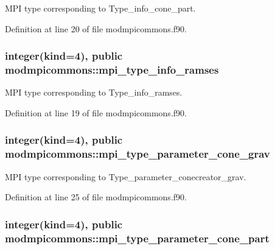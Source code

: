 M\-P\-I type corresponding to Type\-\_\-info\-\_\-cone\-\_\-part. 



Definition at line 20 of file modmpicommons.\-f90.

\hypertarget{classmodmpicommons_ad9669ed4065b2389ec88512a5fa63c3c}{
\subsubsection[{mpi\-\_\-type\-\_\-info\-\_\-ramses}]{\setlength{\rightskip}{0pt plus 5cm}integer(kind=4), public modmpicommons\-::mpi\-\_\-type\-\_\-info\-\_\-ramses}}\label{classmodmpicommons_ad9669ed4065b2389ec88512a5fa63c3c}


M\-P\-I type corresponding to Type\-\_\-info\-\_\-ramses. 



Definition at line 19 of file modmpicommons.\-f90.

\hypertarget{classmodmpicommons_a9f948ab13dbfdd8f08dede33bd3deed1}{
\subsubsection[{mpi\-\_\-type\-\_\-parameter\-\_\-cone\-\_\-grav}]{\setlength{\rightskip}{0pt plus 5cm}integer(kind=4), public modmpicommons\-::mpi\-\_\-type\-\_\-parameter\-\_\-cone\-\_\-grav}}\label{classmodmpicommons_a9f948ab13dbfdd8f08dede33bd3deed1}


M\-P\-I type corresponding to Type\-\_\-parameter\-\_\-conecreator\-\_\-grav. 



Definition at line 25 of file modmpicommons.\-f90.

\hypertarget{classmodmpicommons_a5ea3acdd1a05643c2a359ed42abd3264}{
\subsubsection[{mpi\-\_\-type\-\_\-parameter\-\_\-cone\-\_\-part}]{\setlength{\rightskip}{0pt plus 5cm}integer(kind=4), public modmpicommons\-::mpi\-\_\-type\-\_\-parameter\-\_\-cone\-\_\-part}}\label{classmodmpicommons_a5ea3acdd1a05643c2a359ed42abd3264}


